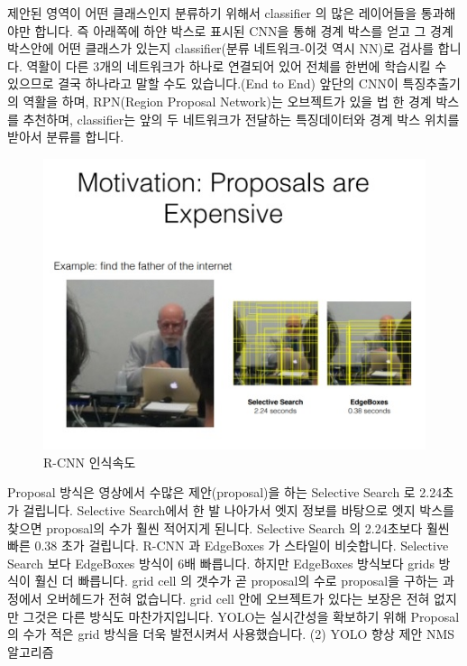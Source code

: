 \documentclass{article}
\begin{document}
제안된 영역이 어떤 클래스인지 분류하기 위해서 classifier 의 많은 레이어들을 통과해야만 합니다.
즉 아래쪽에 하얀 박스로 표시된 CNN을 통해 경계 박스를 얻고 그 경계박스안에 어떤 클래스가 있는지
classifier(분류 네트워크-이것 역시 NN)로 검사를 합니다.
 역활이 다른 3개의 네트워크가 하나로 연결되어 있어 전체를 한번에 학습시킬 수 있으므로 결국 하나라고 말할 수도 있습니다.(End to End)
앞단의 CNN이 특징추출기의 역활을 하며, RPN(Region Proposal Network)는 오브젝트가 있을 법 한 경계 박스를 추천하며,
classifier는 앞의 두 네트워크가 전달하는 특징데이터와 경계 박스 위치를 받아서 분류를 합니다.


\begin{figure}[h!]
\centering
\includegraphics[scale=3.0]{enhanceyolo1.jpg}
\caption{R-CNN 인식속도}
\label{fig:detect}
\end{figure}


Proposal 방식은 영상에서 수많은 제안(proposal)을 하는 Selective Search 로 2.24초가 걸립니다.
\newline Selective Search에서 한 발 나아가서 엣지 정보를 바탕으로 엣지 박스를 찾으면 proposal의 수가 훨씬 적어지게 된니다.
Selective Search 의 2.24초보다 훨씬 빠른 0.38 초가 걸립니다. 
R-CNN 과 EdgeBoxes 가 스타일이 비슷합니다.
\newline Selective Search 보다 EdgeBoxes 방식이 6배 빠릅니다.
하지만 EdgeBoxes 방식보다 grids 방식이 훨신 더 빠릅니다.
\newline grid cell 의 갯수가 곧 proposal의 수로 proposal을 구하는 과정에서 오버헤드가 전혀 없습니다.
grid cell 안에 오브젝트가 있다는 보장은 전혀 없지만 그것은 다른 방식도 마찬가지입니다.
\newline YOLO는 실시간성을 확보하기 위해 Proposal의 수가 적은 grid 방식을 더욱 발전시켜서 사용했습니다.
\newline
\newline (2) YOLO 향상 제안 NMS 알고리즘
\end{document}
